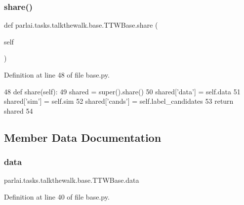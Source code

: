 \subsubsection{\texorpdfstring{share()}{share()}}
{\footnotesize\ttfamily def parlai.\+tasks.\+talkthewalk.\+base.\+T\+T\+W\+Base.\+share (\begin{DoxyParamCaption}\item[{}]{self }\end{DoxyParamCaption})}



Definition at line 48 of file base.\+py.


\begin{DoxyCode}
48     \textcolor{keyword}{def }share(self):
49         shared = super().share()
50         shared[\textcolor{stringliteral}{'data'}] = self.data
51         shared[\textcolor{stringliteral}{'sim'}] = self.sim
52         shared[\textcolor{stringliteral}{'cands'}] = self.label\_candidates
53         \textcolor{keywordflow}{return} shared
54 
\end{DoxyCode}


\subsection{Member Data Documentation}
\mbox{\label{classparlai_1_1tasks_1_1talkthewalk_1_1base_1_1TTWBase_a3080a626f294ef819e26aedb322ee99a}} 
\subsubsection{\texorpdfstring{data}{data}}
{\footnotesize\ttfamily parlai.\+tasks.\+talkthewalk.\+base.\+T\+T\+W\+Base.\+data}



Definition at line 40 of file base.\+py.

\mbox{\label{classparlai_1_1tasks_1_1talkthewalk_1_1base_1_1TTWBase_a0c6f24b6c2fa6e69d28606ac2cabab01}} 
